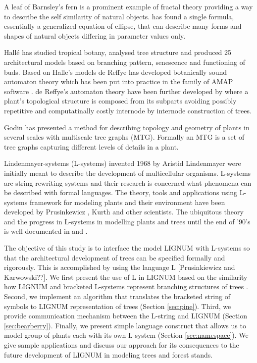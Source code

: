 A leaf  of Barnsley's fern \citep{barnsley:00} is  a prominent example
of fractal theory  providing a way to describe  the self similarity of
natural  objects.  \citet{gielis:03}   has  found  a  single  formula,
essentially a generalized equation  of ellipse, that can describe many
forms and shapes of natural objects differing in parameter values only.

Hall\'e  \citep{halle:78} has studied  tropical botany,  analysed tree
structure  and produced  25  architectural models  based on  branching
pattern, senescence and functioning  of buds.  Based on Halle's models
de  Reffye   \citep[overview][]{dereffye:89,  jaeger:92,  dereffye:95,
  dereffye:97} has developed  botanically sound automaton theory which
has  been   put  into  practice   in  the  family  of   AMAP  software
\citep{fourcard:97}.  de  Reffye's automaton theory  have been further
developed by  \citet{yan:01} where a plant's  topological structure is
composed   from  its   subparts  avoiding   possibly   repetitive  and
computatinally costly internode by internode construction of trees.

Godin \citep{godin:99} has presented  a method for describing topology
and geometry of  plants in several scales with  multiscale tree graphs
(MTG).  Formally an  MTG  is  a set  of  tree graphs  \citep{godin:98}
capturing different levels of details in a plant.

Lindenmayer-systems (L-systems)  invented 1968 by  Aristid Lindenmayer
\citep{lindenmayer:68,   lindenmayer:71}  were   initially   meant  to
describe  the development of  multicellular organisms.   L-systems are
string  rewriting  systems  and   their  research  is  concerned  what
phenomena can  be described with  formal languages. The  theory, tools
and  applications using  L-systems framework  for modeling  plants and
their    environment    have    been   developed    by    Prusinkewicz
\citep{pp:89,pp:92}, Kurth \citep{kurth:94} and other scientists.  The
ubiquitous theory  and the progress  in L-systems in  modelling plants
and   trees  until   the  end   of   '90's  is   well  documented   in
\citet{pp:96,pp:99} and \citet{kurth:99}.

The  objective of this  study is  to interface  the model  LIGNUM with
L-systems  so  that the  architectural  development  of  trees can  be
specified formally  and rigorously. This is accomplished  by using the
language L [Prusinkiewicz and  Karwowski??].  We first present the use
of  L in  LIGNUM  based on  the  similarity how  LIGNUM and  bracketed
L-systems     represent      branching     structures     of     trees
\citep{perttunen:96,perttunen:01}.  Second,  we implement an algorithm
that   translates  the   bracketed   string  of   symbols  to   LIGNUM
representation of  trees (Section \ref{sec:pine}).   Third, we provide
communication  mechanism  between  the  L-string and  LIGNUM  (Section
\ref{sec:bearberry}).  Finally,  we present simple  language construct
that allows  us to model  group of plants  each with its  own L-system
(Section  \ref{sec:namespace}).   We   give  sample  applications  and
discuss our approach for its consequences to the future development of
LIGNUM in modeling trees and forest stands.


